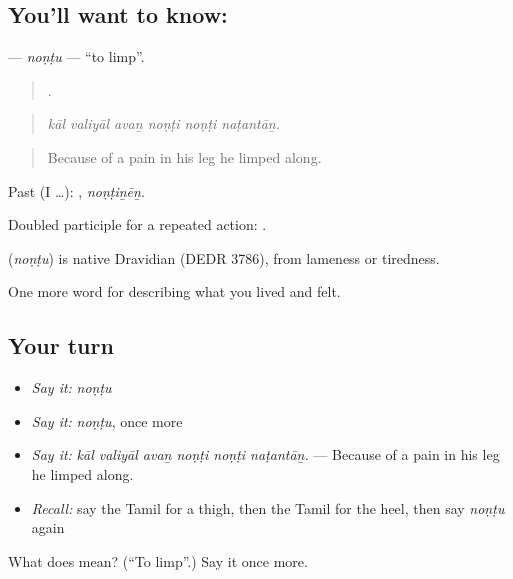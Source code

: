 \subsection*{You'll want to know: }
\textbf{} — \emph{noṇṭu} — \textquotedblleft{}to limp\textquotedblright{}.

\begin{quote}
     .
\end{quote}

\begin{quote}
\emph{kāl valiyāl avaṉ noṇṭi noṇṭi naṭantāṉ.}
\end{quote}

\begin{quote}
Because of a pain in his leg he limped along.
\end{quote}

Past (I …): , \emph{noṇṭiṉēṉ}.

Doubled participle for a repeated action:   .

\begin{cousinweb}
\textbf{} (\emph{noṇṭu}) is native Dravidian (DEDR 3786), from lameness or tiredness.
\end{cousinweb}

\begin{grammarlens}[title={What you've built}]
One more word for describing what you lived and felt.
\end{grammarlens}

\subsection*{Your turn}
\begin{itemize}
\raggedright
  \item \emph{Say it:} \emph{noṇṭu}
  \item \emph{Say it:} \emph{noṇṭu}, once more
  \item \emph{Say it:} \emph{kāl valiyāl avaṉ noṇṭi noṇṭi naṭantāṉ.} — Because of a pain in his leg he limped along.
  \item \emph{Recall:} say the Tamil for a thigh, then the Tamil for the heel, then say \emph{noṇṭu} again
\end{itemize}

\begin{tcolorbox}[breakable,colback=teal!4,colframe=teal!35!black,title={Before you move on}]
What does  mean? (\textquotedblleft{}To limp\textquotedblright{}.) Say it once more.
\end{tcolorbox}
